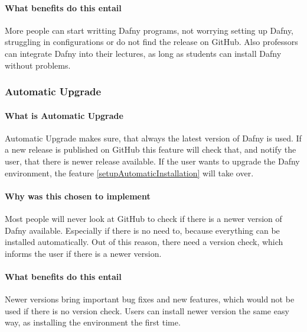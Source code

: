 \paragraph{What benefits do this entail}
More people can start writting Dafny programs, not worrying setting up Dafny, struggling in configurations or do not find the release on GitHub. Also professors can integrate Dafny into their lectures, as long as students can install Dafny without problems. 


\subsubsection{Automatic Upgrade} \label{setupAutomaticUpgrade}

\paragraph{What is Automatic Upgrade}
Automatic Upgrade makes sure, that always the latest version of Dafny is used. If a new release is published on GitHub this feature will check that, and notify the user, that there is newer release available. If the user wants to upgrade the Dafny environment, the feature \ref{setupAutomaticInstallation} will take over. 

\paragraph{Why was this chosen to implement}
Most people will never look at GitHub to check if there is a newer version of Dafny available. Especially if there is no need to, because everything can be installed automatically. Out of this reason, there need a version check, which informs the user if there is a newer version. 


\paragraph{What benefits do this entail}
Newer versions bring important bug fixes and new features, which would not be used if there is no version check. Users can install newer version the same easy way, as installing the environment the first time.  

